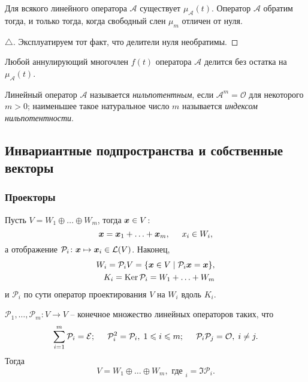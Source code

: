 \begin{to_thr} 
    Для всякого линейного оператора $\mathcal A $ существует $\mu_{\mathcal A} (t) $. Оператор $\mathcal A $ обратим тогда, и только тогда, когда свободный слен $\mu_m $ отличен от нуля. 
\end{to_thr}

\begin{proof}[$\triangle$]
    Эксплуатируем тот факт, что делители нуля необратимы.
\end{proof}

\begin{to_thr} 
    Любой аннулирующий многочлен $f(t) $ оператора $\mathcal A $ делится без остатка на $\mu_{\mathcal A} (t) $. 
\end{to_thr}

\begin{to_def} 
    Линейный оператор $\mathcal A $ называется \textit{нильпотентным}, если $\mathcal A^m = \mathcal O $ для некоторого $m > 0 $; наименьшее такое натуральное число $m $ называется \textit{индексом нильпотентности}. 
\end{to_def}


\subsection{Инвариантные подпространства и собственные векторы}


\subsubsection{Проекторы}

Пусть $V = W_1 \oplus \ldots \oplus W_m $, тогда $\vc{x} \in V $:
$$
    \vc{x} = \vc{x}_1 + \ldots + \vc{x}_m, \hspace{0.5cm} x_i \in W_i,
$$
а отображение $\mathcal P_i \colon \vc{x} \mapsto \vc{x}_i \in \mathcal L (V)$. Наконец,
\begin{align*}
     W_i = \mathcal P_i V = \{\vc{x} \in V \mid \mathcal P_i \vc{x} = \vc{x}\}, \\
     K_i = \Ker \mathcal P_i = W_1 + \ldots + W_m
\end{align*} 
и $\mathcal P_i $ по сути оператор проектирования $V $ на $W_i $ вдоль $K_i $.

\begin{to_thr} 
    $\mathcal P_1, \ldots, \mathcal P_m \colon V \to V $ -- конечное множество линейных операторов таких, что 
$$
    \sum_{i=1}^m \mathcal P_i = \mathcal E; \hspace{0.5cm} \mathcal P_i^2 = \mathcal P_i, \; 1 \leq i \leq m; \hspace{0.5cm} \mathcal P_i \mathcal P_j = \mathcal O, \; i \neq j.
$$
Тогда 
$$
    V = W_1 \oplus \ldots \oplus W_m, \text{ где } _i = \Im \mathcal P_i.
$$
\end{to_thr}


